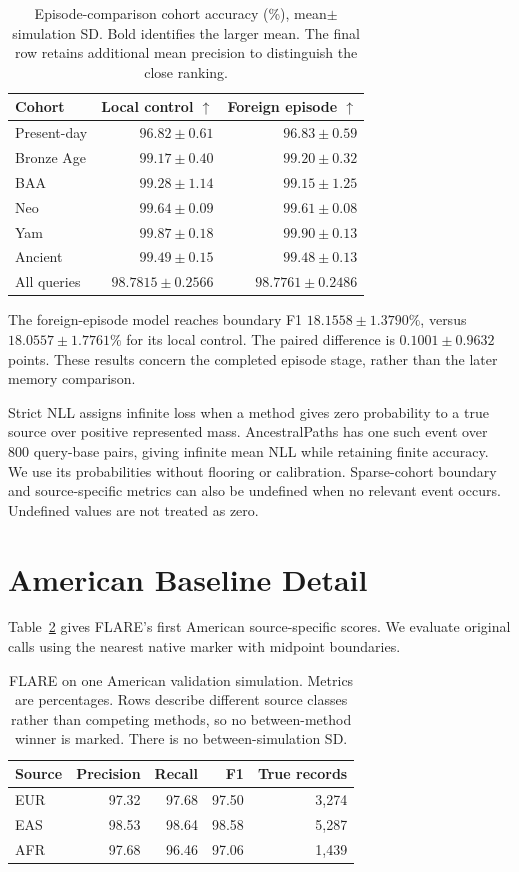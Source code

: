 \documentclass[letterpaper]{article}
\newcommand{\best}[1]{\mathbf{#1}}
\begin{document}
\begin{table}[t]
\centering
\small
\begin{tabular}{@{}lrr@{}}
\toprule
Cohort & Local control $\uparrow$ & Foreign episode $\uparrow$\\
\midrule
Present-day &$96.82\pm0.61$&$\best{96.83\pm0.59}$\\
Bronze Age &$99.17\pm0.40$&$\best{99.20\pm0.32}$\\
BAA &$\best{99.28\pm1.14}$&$99.15\pm1.25$\\
Neo &$\best{99.64\pm0.09}$&$99.61\pm0.08$\\
Yam &$99.87\pm0.18$&$\best{99.90\pm0.13}$\\
Ancient &$\best{99.49\pm0.15}$&$99.48\pm0.13$\\
All queries &$\best{98.7815\pm0.2566}$&$98.7761\pm0.2486$\\
\bottomrule
\end{tabular}
\caption{Episode-comparison cohort accuracy (\%), mean$\pm$simulation SD. Bold identifies the larger mean. The final row retains additional mean precision to distinguish the close ranking. }
\label{tab:episodecohorts}
\end{table}

The foreign-episode model reaches boundary F1 $18.1558\pm1.3790\%$, versus $18.0557\pm1.7761\%$ for its local control. The paired difference is $0.1001\pm0.9632$ points. These results concern the completed episode stage, rather than the later memory comparison.

Strict NLL assigns infinite loss when a method gives zero probability to a true source over positive represented mass. AncestralPaths has one such event over 800 query-base pairs, giving infinite mean NLL while retaining finite accuracy. We use its probabilities without flooring or calibration. Sparse-cohort boundary and source-specific metrics can also be undefined when no relevant event occurs. Undefined values are not treated as zero.

\section{American Baseline Detail}
Table~\ref{tab:flare} gives FLARE's first American source-specific scores. We evaluate original calls using the nearest native marker with midpoint boundaries.

\begin{table}[t]
\centering
\small
\begin{tabular}{@{}lrrrr@{}}
\toprule
Source & Precision & Recall & F1 & True records\\
\midrule
EUR &97.32&97.68&97.50&3,274\\
EAS &98.53&98.64&98.58&5,287\\
AFR &97.68&96.46&97.06&1,439\\
\bottomrule
\end{tabular}
\caption{FLARE on one American validation simulation. Metrics are percentages. Rows describe different source classes rather than competing methods, so no between-method winner is marked. There is no between-simulation SD.}
\label{tab:flare}
\end{table}
\end{document}
